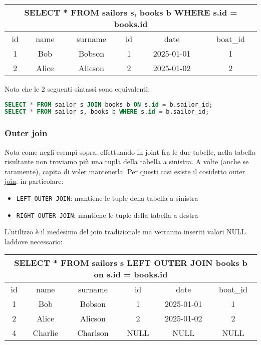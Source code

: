\begin{center}
	\begin{tabular}{| c | c | c | c | c | c |}
		\multicolumn{6}{c}{{\ttfamily SELECT * FROM sailors s, books b WHERE s.id = books.id}} \\
		\hline
		id & name  & surname & id & date       & boat\_id                                      \\
		\hline
		\hline
		1  & Bob   & Bobson  & 1  & 2025-01-01 & 1                                             \\
		2  & Alice & Alicson & 2  & 2025-01-02 & 2                                             \\
		\hline
	\end{tabular}
\end{center}

Nota che le 2 seguenti sintassi sono equivalenti:

\begin{lstlisting}[language = SQL, style = SQL, frame = none]
SELECT * FROM sailor s JOIN books b ON s.id = b.sailor_id;
SELECT * FROM sailor s, books b WHERE s.id = b.sailor_id;
\end{lstlisting}


\subsubsection{Outer join}
Nota come negli esempi sopra, effettuando in joint fra le due tabelle, nella tabella risultante non troviamo più una tupla della tabella a sinistra.
A volte (anche se raramente), capita di voler mantenerla. Per questi casi esiste il cosidetto \underline{outer join}. in particolare:
\begin{itemize}
	\item \texttt{LEFT OUTER JOIN}: mantiene le tuple della tabella a sinistra
	\item \texttt{RIGHT OUTER JOIN}: mantiene le tuple della tabella a destra
\end{itemize}
L'utilizzo è il medesimo del join tradizionale ma verranno inseriti valori {\ttfamily NULL} laddove necessario:

\begin{center}
	\begin{tabular}{| c | c | c | c | c | c |}
		\multicolumn{6}{c}{{\ttfamily SELECT * FROM sailors s LEFT OUTER JOIN books b on s.id = books.id}} \\
		\hline
		id & name    & surname  & id   & date       & boat\_id                                             \\
		\hline
		\hline
		1  & Bob     & Bobson   & 1    & 2025-01-01 & 1                                                    \\
		2  & Alice   & Alicson  & 2    & 2025-01-02 & 2                                                    \\
		4  & Charlie & Charlson & NULL & NULL       & NULL                                                 \\
		\hline
	\end{tabular}
\end{center}
